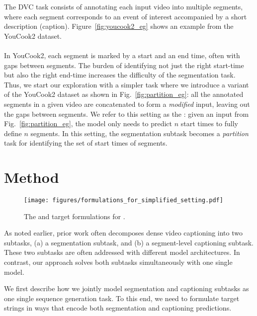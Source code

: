 \documentclass[11pt]{article}
\begin{document}
The DVC task consists of annotating each input video into multiple segments, where each segment corresponds to an event of interest accompanied by a short description (caption).  
Figure~\ref{fig:youcook2_eg} shows an example from the YouCook2 dataset.

\paragraph{\Partitiontask}
In YouCook2, each segment is marked by a start and an end time, often with gaps between segments. 
The burden of identifying not just the right start-time but also the right end-time increases the difficulty of the segmentation task. Thus, we start our exploration with a simpler task where we introduce a variant of the YouCook2 dataset as shown in Fig.~\ref{fig:partition_eg}: all the annotated segments in a given video are concatenated to form a {\em modified} input, leaving out the gaps between segments. 
We refer to this setting as the {\em \partitiontask}:
given an input from Fig.~\ref{fig:partition_eg}, the model only needs to predict $n$ start times to fully define $n$ segments.
In this setting, the segmentation subtask becomes a {\em partition} task for identifying the set of start times of segments.

 \section{Method}
\label{sec:model}

\begin{figure*}[htbp]
    \centering
    \vspace{-1ex}
    \texttt{[image: figures/formulations\_for\_simplified\_setting.pdf]}
    \caption{The \hardencoding and \offsetbased target formulations for \partitiontask.
    }
    \label{fig:formulations}
\vspace{-1ex}
\end{figure*}

As noted earlier, prior work often decomposes dense video captioning into two subtasks, (a) a segmentation subtask, and (b) a segment-level captioning subtask.
These two subtasks are often addressed with different model architectures.
In contrast, our approach solves both subtasks simultaneously with one single model.  

We first describe how we jointly model segmentation and captioning subtasks as one single sequence generation task.  To this end, we need to formulate target strings in ways that encode both segmentation and captioning predictions.
\end{document}
